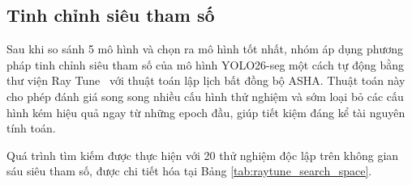 \begin{table}[htbp]
    \centering
    \caption{Cấu hình tham số riêng theo yêu cầu kiến trúc từng mô hình}
    \label{tab:specific_train_config}
\end{table}

\subsection{Tinh chỉnh siêu tham số}
Sau khi so sánh 5 mô hình và chọn ra mô hình tốt nhất, nhóm áp dụng phương pháp tinh chỉnh siêu tham số của mô hình YOLO26-seg một cách tự động bằng thư viện Ray Tune~\cite{liaw2018tune} với thuật toán lập lịch bất đồng bộ ASHA. Thuật toán này cho phép đánh giá song song nhiều cấu hình thử nghiệm và sớm loại bỏ các cấu hình kém hiệu quả ngay từ những epoch đầu, giúp tiết kiệm đáng kể tài nguyên tính toán.

Quá trình tìm kiếm được thực hiện với 20 thử nghiệm độc lập trên không gian sáu siêu tham số, được chi tiết hóa tại Bảng \ref{tab:raytune_search_space}.


